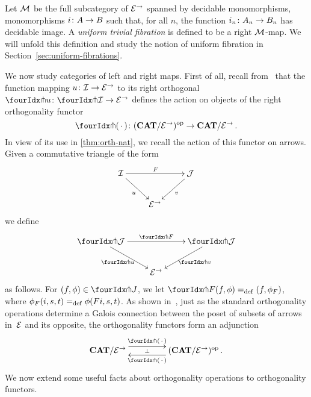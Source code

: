 \documentclass[reqno,10pt,a4paper,oneside]{amsart}
\begin{document}
\begin{example}  \label{exa-triv-kan-fib}
Let $\cal{M}$ be the full subcategory of $\cal{E}^\to$ spanned by decidable monomorphisms, \ie
monomorphisms $i \co A \to B$ such that, for all $n$, the function $i_n \co A_n \to B_n$ has decidable
image. A \emph{uniform trivial fibration} is defined to be a right $\cal{M}$-map. We will unfold this
definition and study the notion of uniform  fibration in Section~\ref{sec:uniform-fibrations}.
\end{example}




We now study categories of left and right maps. First of all, recall from~\cite{garner:small-object-argument} that the function mapping $u \co \cal{I} \to \catE^\to$ to its right orthogonal $\liftr{u} \co \liftr{\cal{I}} \to \cal{E}^\to$ defines the action on objects of the right orthogonality functor
\[
\liftr{\brarghole} \co  (\CAT/\catE^{\to})^{\op} \to \CAT/\catE^{\to} \, .
\]
In view of its use in \cref{thm:orth-nat}, we recall the action of this functor on arrows. Given a commutative triangle of the form
\[
\xymatrix{
\cal{I} \ar[dr]_u \ar[rr]^F & & \cal{J} \ar[dl]^{v} \\
 & \catE^\to }
 \]
we define 
\[
\xymatrix{
\liftr{\cal{J}} \ar[dr]_{\liftr{u}} \ar[rr]^{\liftr{F}} & & \liftr{\cal{J}} \ar[dl]^{\liftr{v}} \\
 & \catE^\to }
\]
as follows. For $(f, \phi) \in \liftr{J}$, we let $\liftr{F}(f,\phi) \defeq (f, \phi_F)$, where $\phi_F(i, s, t) \defeq \phi(Fi, s, t)$. 
As shown in~\cite{garner:small-object-argument}, 
just as the standard orthogonality operations determine a Galois connection between the poset of subsets of arrows in~$\catE$ and its opposite, the orthogonality functors form an adjunction 
\begin{equation}
\label{garner-adjunction}
\begin{gathered}
\xymatrix@C+2em{
  \CAT/\catE^{\to}
  \ar@<5pt>[r]^-{\liftl{\brarghole}}
  \ar@{}[r]|-{\bot}
&
  (\CAT/\catE^{\to})^{\op} \, .
  \ar@<5pt>[l]^-{\liftr{\brarghole}}
}
\end{gathered}
\end{equation}
We now extend some useful facts about orthogonality operations to orthogonality functors.
\end{document}
